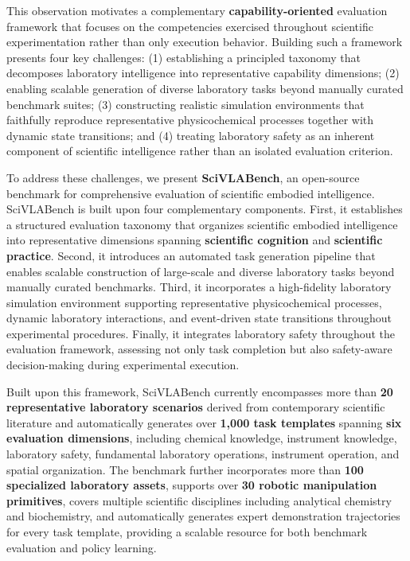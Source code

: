 \documentclass[sigconf]{acmart}
\begin{document}
This observation motivates a complementary \textbf{capability-oriented} evaluation framework that focuses on the competencies exercised throughout scientific experimentation rather than only execution behavior. Building such a framework presents four key challenges: (1) establishing a principled taxonomy that decomposes laboratory intelligence into representative capability dimensions; (2) enabling scalable generation of diverse laboratory tasks beyond manually curated benchmark suites; (3) constructing realistic simulation environments that faithfully reproduce representative physicochemical processes together with dynamic state transitions; and (4) treating laboratory safety as an inherent component of scientific intelligence rather than an isolated evaluation criterion.

To address these challenges, we present \textbf{SciVLABench}, an open-source benchmark for comprehensive evaluation of scientific embodied intelligence. SciVLABench is built upon four complementary components. First, it establishes a structured evaluation taxonomy that organizes scientific embodied intelligence into representative dimensions spanning \textbf{scientific cognition} and \textbf{scientific practice}. Second, it introduces an automated task generation pipeline that enables scalable construction of large-scale and diverse laboratory tasks beyond manually curated benchmarks. Third, it incorporates a high-fidelity laboratory simulation environment supporting representative physicochemical processes, dynamic laboratory interactions, and event-driven state transitions throughout experimental procedures. Finally, it integrates laboratory safety throughout the evaluation framework, assessing not only task completion but also safety-aware decision-making during experimental execution.

Built upon this framework, SciVLABench currently encompasses more than \textbf{20 representative laboratory scenarios} derived from contemporary scientific literature and automatically generates over \textbf{1,000 task templates} spanning \textbf{six evaluation dimensions}, including chemical knowledge, instrument knowledge, laboratory safety, fundamental laboratory operations, instrument operation, and spatial organization. The benchmark further incorporates more than \textbf{100 specialized laboratory assets}, supports over \textbf{30 robotic manipulation primitives}, covers multiple scientific disciplines including analytical chemistry and biochemistry, and automatically generates expert demonstration trajectories for every task template, providing a scalable resource for both benchmark evaluation and policy learning.
\end{document}
